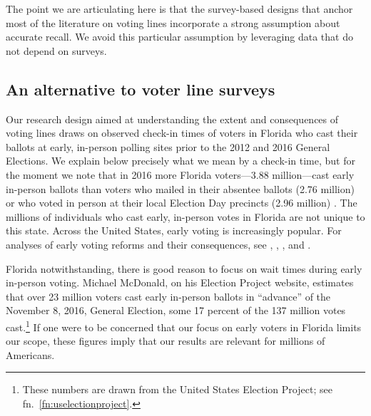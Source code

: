 \documentclass[12pt,titlepage]{article}
\begin{document}
The point we are articulating here is that the survey-based designs
that anchor most of the literature on voting lines incorporate a
strong assumption about accurate recall. We avoid this particular
assumption by leveraging data that do not depend on surveys.

\subsection*{An alternative to voter line surveys}

Our research design aimed at understanding the extent and consequences
of voting lines draws on \mbox{observed} check-in times of voters in
Florida who cast their ballots at early, in-person polling sites prior
to the 2012 and 2016 General Elections. We explain below precisely
what we mean by a check-in time, but for the moment we note that in
2016 more Florida voters---3.88 million---cast early in-person ballots
than voters who mailed in their absentee ballots (2.76 million) or who
voted in person at their local Election Day precincts (2.96 million)
\citep{FDOS:2016vote}. The millions of individuals who cast early,
in-person votes in Florida are not unique to this state. Across the
United States, early voting is increasingly popular. For analyses of
early voting reforms and their consequences, see
\citet{neelyrichardson:earlyvoting}, \citet{gronkebaum:growth},
\citet{gronketoffey:psychological}, and
\citet{burdenetal:unanticipated}.




Florida notwithstanding, there is good reason to focus on wait times
during early in-person voting. Michael McDonald, on his Election
Project website, estimates that over 23 million voters cast early
in-person ballots in ``advance'' of the November 8, 2016, General
Election, some 17 percent of the 137 million votes
cast.\footnote{These numbers are drawn from the United States Election
  Project; see fn.\ \ref{fn:uselectionproject}.} If one were to be
concerned that our focus on early voters in Florida limits our scope,
these figures imply that our results are relevant for millions of
Americans.

\end{document}
